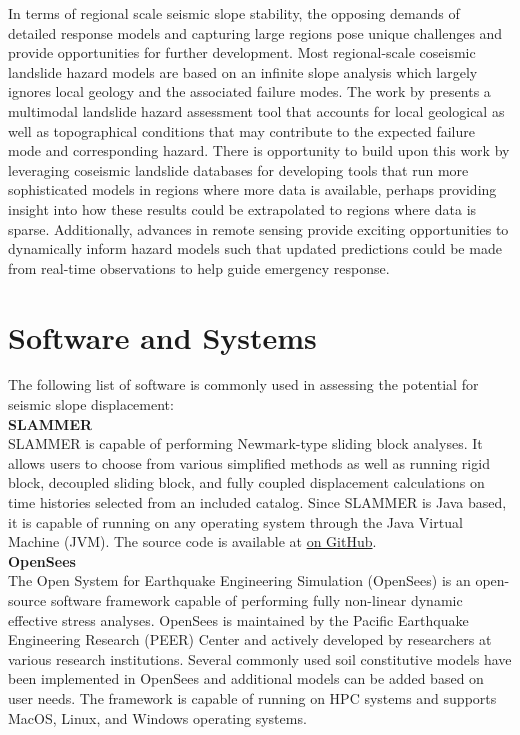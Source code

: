 In terms of regional scale seismic slope stability, the opposing demands of detailed response models and capturing large regions pose unique challenges and provide opportunities for further development. Most regional-scale coseismic landslide hazard models are based on an infinite slope analysis which largely ignores local geology and the associated failure modes. The work by \cite{grant2016multimodal} presents a multimodal landslide hazard assessment tool that accounts for local geological as well as topographical conditions that may contribute to the expected failure mode and corresponding hazard. There is opportunity to build upon this work by leveraging coseismic landslide databases for developing tools that run more sophisticated models in regions where more data is available, perhaps providing insight into how these results could be extrapolated to regions where data is sparse. Additionally, advances in remote sensing provide exciting opportunities to dynamically inform hazard models such that updated predictions could be made from real-time observations to help guide emergency response.


\section{Software and Systems}
\label{sec:eq_landslide_tools}

The following list of software is commonly used in assessing the potential for seismic slope displacement:\\

\noindent\textbf{SLAMMER}\\
SLAMMER \citep{jibson2013slammer} is capable of performing Newmark-type sliding block analyses. It allows users to choose from various simplified methods as well as running rigid block, decoupled sliding block, and fully coupled displacement calculations on time histories selected from an included catalog. Since SLAMMER is Java based, it is capable of running on any operating system through the Java Virtual Machine (JVM). The source code is available at \href{https://github.com/mjibson/slammer}{on GitHub}. \\

\noindent\textbf{OpenSees}\\
The Open System for Earthquake Engineering Simulation (OpenSees) is an open-source software framework capable of performing fully non-linear dynamic effective stress analyses. OpenSees is maintained by the Pacific Earthquake Engineering Research (PEER) Center and actively developed by researchers at various research institutions. Several commonly used soil constitutive models have been implemented in OpenSees and additional models can be added based on user needs. The framework is capable of running on HPC systems and supports MacOS, Linux, and Windows operating systems.\\

